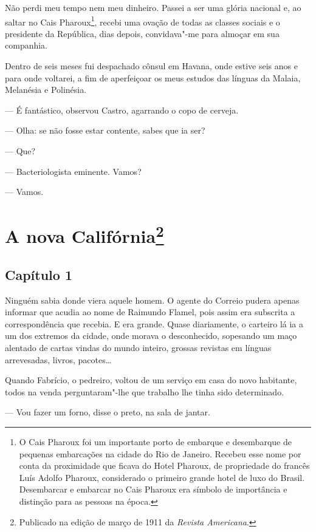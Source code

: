 Não perdi meu tempo nem meu dinheiro. Passei a ser uma glória nacional
e, ao saltar no Cais Pharoux\footnote{O Cais Pharoux foi um importante
  porto de embarque e desembarque de pequenas embarcações na cidade do
  Rio de Janeiro. Recebeu esse nome por conta da proximidade que ficava
  do Hotel Pharoux, de propriedade do francês Luís Adolfo Pharoux,
  considerado o primeiro grande hotel de luxo do Brasil. Desembarcar e
  embarcar no Cais Pharoux era símbolo de importância e distinção para
  as pessoas na época.}, recebi uma ovação de todas as classes sociais e
o presidente da República, dias depois, convidava"-me para almoçar em sua
companhia.

Dentro de seis meses fui despachado cônsul em Havana, onde estive seis
anos e para onde voltarei, a fim de aperfeiçoar os meus estudos das
línguas da Malaia, Melanésia e Polinésia.

--- É fantástico, observou Castro, agarrando o copo de cerveja.

--- Olha: se não fosse estar contente, sabes que ia ser?

--- Que?

--- Bacteriologista eminente. Vamos?

--- Vamos.



\chapter[A nova Califórnia]{A nova Califórnia\footnote[*]{Publicado na edição de março de 1911 da \emph{Revista Americana}.}}

\section*{Capítulo 1}

\noindent{}Ninguém sabia donde viera aquele homem. O agente do Correio pudera
apenas informar que acudia ao nome de Raimundo Flamel, pois assim era
subscrita a correspondência que recebia. E era grande. Quase
diariamente, o carteiro lá ia a um dos extremos da cidade, onde morava o
desconhecido, sopesando um maço alentado de cartas vindas do mundo
inteiro, grossas revistas em línguas arrevesadas, livros, pacotes\ldots{}

Quando Fabrício, o pedreiro, voltou de um serviço em casa do novo
habitante, todos na venda perguntaram"-lhe que trabalho lhe tinha sido
determinado.

--- Vou fazer um forno, disse o preto, na sala de jantar.

